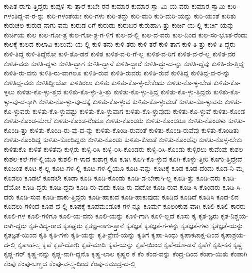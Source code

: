 {ಕುಪಿತ-ರಾಗು-ತ್ತಿದ್ದರು
ಕುಪ್ಪಳಿ-ಸು-ತ್ತಾರೆ
ಕುಬೇ-ರನ
ಕುಮಾರ
ಕುಮಾರ-ಸ್ವಾ-ಮಿ-ಯ-ವರು
ಕುಮಾರ-ಸ್ವಾಮಿ
ಕುರಿ-ಗಳಂತಿದ್ದ-ವ-ರ-ನ್ನು
ಕುರಿ-ಗಳಂತೆಯೇ
ಕುರಿ-ಗಳು
ಕುರಿ-ತದ್ದು
ಕುರಿ-ಮರಿ
ಕುರಿ-ಮರಿ-ಯನ್ನು
ಕುರಿ-ಯಂತೆ
ಕುರಿತು
ಕುರುಚಲ
ಕುರುಡ-ನಾಗು-ವನು
ಕುರುಡ-ರಿಗೆ
ಕುರುಡು
ಕುರುಬರ
ಕುರುಹಾಗಿ-ತ್ತು
ಕುರ್ಚಿ-ಯ-ಲ್ಲಿ
ಕುರ್ಚಿ-ಯನ್ನು
ಕುರ್ಚಿಯ
ಕುಲ
ಕುಲ-ಗೋ-ತ್ರ
ಕುಲ-ಗೋ-ತ್ರ-ಗ-ಳಿಗೆ
ಕುಲ-ದ-ಲ್ಲಿ
ಕುಲ-ದ-ವರು
ಕುಲ-ದಿಂದ
ಕುಲ-ಸಂ-ಭೂತ-ರೆಂದು
ಕುಲಕ್ಕೆ
ಕುಲದ
ಕುಲಾವಿ
ಕುಲುಮೆ-ಯ-ಲ್ಲಿ
ಕುಳಿ-ತನು
ಕುಳಿ-ತರು
ಕುಳಿ-ತರೆ
ಕುಳಿ-ತಾಗ
ಕುಳಿ-ತಿ-ತ್ತು
ಕುಳಿ-ತಿ-ದ್ದರು
ಕುಳಿ-ತಿದ್ದೆ
ಕುಳಿ-ತಿದ್ದೆನೋ
ಕುಳಿ-ತೊ-ಡನೆ
ಕುಳಿತ
ಕುಳಿತ-ವ-ರಿ-ಗೆ-ಲ್ಲ
ಕುಳಿತ-ವ-ರಿಗೆ
ಕುಳಿತ-ವ-ರೆ-ಲ್ಲ
ಕುಳಿತ-ವರ
ಕುಳಿತ-ವರು
ಕುಳಿತಿ-ದ್ದಳು
ಕುಳಿತಿ-ದ್ದಾಗ
ಕುಳಿತಿ-ದ್ದಾನೆ
ಕುಳಿತಿ-ದ್ದಾರೆ
ಕುಳಿತಿ-ದ್ದು-ದ-ನ್ನು
ಕುಳಿತಿ-ದ್ದೆವು
ಕುಳಿತಿ-ರು-ತ್ತಿದ್ದ
ಕುಳಿತಿ-ರು-ವನು
ಕುಳಿತಿ-ರು-ವಾಗಲೂ
ಕುಳಿತಿ-ರುವ
ಕುಳಿತಿ-ರುವರು
ಕುಳಿತಿ-ರುವೆ
ಕುಳಿತಿದ್ದ
ಕುಳಿತಿದ್ದ-ವ-ರ-ನ್ನು
ಕುಳಿತಿದ್ದ-ವರು
ಕುಳಿತಿದ್ದೀಯೋ
ಕುಳಿತಿರಲು
ಕುಳಿತು
ಕುಳಿತು-ಕೊ-ಳ್ಳ-ಬೇಕೆಂದು
ಕುಳಿತು-ಕೊ-ಳ್ಳ-ಬೇಡ
ಕುಳಿತು-ಕೊ-ಳ್ಳಲು
ಕುಳಿತು-ಕೊ-ಳ್ಳು-ತ್ತದೆ
ಕುಳಿತು-ಕೊ-ಳ್ಳು-ತ್ತಿ-ತ್ತು
ಕುಳಿತು-ಕೊ-ಳ್ಳು-ತ್ತಿದ್ದ
ಕುಳಿತು-ಕೊ-ಳ್ಳು-ತ್ತಿದ್ದರು
ಕುಳಿತು-ಕೊ-ಳ್ಳು-ವು-ದ-ಕ್ಕಾಗಿ
ಕುಳಿತು-ಕೊ-ಳ್ಳು-ವು-ದಕ್ಕೆ
ಕುಳಿತು-ಕೊ-ಳ್ಳುವ
ಕುಳಿತು-ಕೊ-ಳ್ಳುವಂತೆ
ಕುಳಿತು-ಕೊ-ಳ್ಳುವನು
ಕುಳಿತು-ಕೊ-ಳ್ಳುವರು
ಕುಳಿತು-ಕೊ-ಳ್ಳುವಷ್ಟು
ಕುಳಿತು-ಕೊ-ಳ್ಳುವಾಗ
ಕುಳಿತು-ಕೊ-ಳ್ಳುವುದು
ಕುಳಿತು-ಕೊ-ಳ್ಳುವೆ
ಕುಳಿತು-ಕೊಂಡ
ಕುಳಿತು-ಕೊಂಡ-ಮೇಲೆ
ಕುಳಿತು-ಕೊಂಡ-ರೆಂದೂ
ಕುಳಿತು-ಕೊಂಡರು
ಕುಳಿತು-ಕೊಂಡರೂ
ಕುಳಿತು-ಕೊಂಡಳು
ಕುಳಿತು-ಕೊಂಡಿ-ತ್ತು
ಕುಳಿತು-ಕೊಂಡಿ-ರು-ವು-ದ-ನ್ನು
ಕುಳಿತು-ಕೊಂಡಿ-ರುವಂತೆ
ಕುಳಿತು-ಕೊಂಡಿ-ರುವೆವು
ಕುಳಿತು-ಕೊಂಡಿತು
ಕುಳಿತು-ಕೊಂಡಿದ್ದ
ಕುಳಿತು-ಕೊಂಡಿದ್ದರು
ಕುಳಿತು-ಕೊಂಡು
ಕುಳಿತು-ಕೊಂಡೆ
ಕುಳಿತು-ಕೊಂಡೆವು
ಕುಳಿತು-ಕೊಳ್ಳ-ಬೇಕು
ಕುಳಿತುಕೊ
ಕುಳಿತೆ
ಕುಳಿತೆವು
ಕುಳ್ಳರು
ಕುಳ್ಳಿ-ರಿಸಿ
ಕುಳ್ಳಿ-ರಿಸಿ-ಕೊಂಡರು
ಕುಳ್ಳಿ-ರಿಸಿ-ಕೊಂಡು
ಕುಳ್ಳಿರಲು
ಕುವೆಂಪು
ಕುಶಲ
ಕುಶಲ-ಕಲೆ-ಗಳ-ಲ್ಲಿಯೂ
ಕುಶಲಿ-ಗ-ಳಾದ
ಕುಶಾಗ್ರ
ಕೂ
ಕೂಗಿ
ಕೂಗಿ-ಕೊ-ಳ್ಳುವ
ಕೂಗಿ-ಕೊಳ್ಳು-ತ್ತೀರಿ
ಕೂಗು-ತ್ತಿದ್ದೇವೆ
ಕೂಜಂತ
ಕೂಟ-ಕ್ಕೆ-ಲ್ಲ
ಕೂಟ-ಗಳ-ಲ್ಲಿ
ಕೂಟ-ಗಳ-ಲ್ಲಿಯೂ
ಕೂಟ-ವನ್ನು
ಕೂಟಕ್ಕೆ
ಕೂಡ
ಕೂಡ-ದೆಂದು
ಕೂಡ-ನಿ-ಮ್ಮ
ಕೂಡಲು
ಕೂಡಲೆ
ಕೂಡಲೇ
ಕೂಡಾ
ಕೂಡಿ
ಕೂಡಿ-ಕೊಂಡು
ಕೂಡಿ-ಡ-ಬೇಕಾಗಿ-ಲ್ಲ
ಕೂಡಿ-ತ್ತು
ಕೂಡಿ-ದರು
ಕೂಡಿ-ದೆಯೋ
ಕೂಡಿ-ದ್ದರು
ಕೂಡಿ-ದ್ದವು
ಕೂಡಿ-ರು-ವುದು
ಕೂಡಿ-ರು-ವುದೋ
ಕೂಡಿ-ರುವ
ಕೂಡಿ-ಸಿ-ಕೊಂಡರು
ಕೂಡಿ-ಸಿ-ದರು
ಕೂಡಿ-ಸುವ
ಕೂಡಿ-ಹಾಕು-ತ್ತಿದ್ದರು
ಕೂಡಿ-ಹಾಕುವ
ಕೂಡಿ-ಹಾಕುವುದು
ಕೂಡಿದ
ಕೂಡಿದೆ
ಕೂಡಿಸಿ
ಕೂದ-ಲಿನ
ಕೂದಲು-ಗಳಿಂದ
ಕೂಪ-ದ-ಲ್ಲಿ
ಕೂಪಕ್ಕೆ
ಕೂಪಮಂಡೂಕ-ಗಳ-ನ್ನೂ
ಕೂರ್ಮ
ಕೂಲಂಕುಷ-ವಾಗಿ
ಕೂಲಿ
ಕೂಲಿ-ಕಾರರು
ಕೂಲಿ-ಗಳ
ಕೂಲಿ-ಗಳಿಗೂ
ಕೂಲಿ-ಯ-ವನು
ಕೂಲಿ-ಯನ್ನು
ಕೂಳಿ-ಗಾಗಿ
ಕೂಳಿ-ಲ್ಲದೆ
ಕೂಸು
ಕೃ
ಕೃತ-ಜ್ಞರು
ಕೃತ-ನಿಶ್ಚಯ-ರಾಗಿ-ದ್ದರು
ಕೃತ-ವಿದ್ಯ-ರಾದ
ಕೃತಘ್ನರು
ಕೃತಜ್ಞ-ನಾಗು-ತ್ತಾನೆ
ಕೃತಜ್ಞತೆ
ಕೃತಜ್ಞತೆ-ಗ-ಳನ್ನು
ಕೃತಜ್ಞತೆ-ಗಳು
ಕೃತಜ್ಞತೆ-ಯನ್ನು
ಕೃತಜ್ಞತೆ-ಯಿಂದ
ಕೃತಿ
ಕೃತಿ-ಗಳು
ಕೃತಿ-ಯನ್ನು
ಕೃತಿ-ಶ್ರೇಣಿ-ಯನ್ನು
ಕೃತಿಗೆ
ಕೃಪಾ-ಸಿಂಧು
ಕೃಪಾಕಟಾಕ್ಷ-ದಿಂದ
ಕೃಪಾಶ್ರಯ-ದ-ಲ್ಲಿ
ಕೃಪಾಹ-ಸ್ತ
ಕೃಪೆ
ಕೃಪೆ-ದೋರಿ
ಕೃಪೆ-ಮಾಡಿ
ಕೃಪೆ-ಯನ್ನು
ಕೃಪೆ-ಯಿಂದ
ಕೃಪೆ-ಯೊ-ಡನೆ
ಕೃಪೆಗೆ
ಕೃಷಿ-ಕನ
ಕೃಷ್ಣ
ಕೃಷ್ಣ-ಗರ್
ಕೃಷ್ಣ-ನನ್ನು
ಕೃಷ್ಣ-ನಾಗಿ-ದ್ದನೊ
ಕೃಷ್ಣ-ಲಾಲ
ಕೃಷ್ಣರ
ಕೆ
ಕೆಂ
ಕೆಂಡ-ವನ್ನು
ಕೆಂದ್ರ-ದಿಂದ
ಕೆಂಪಾ-ಯಿತು
ಕೆಂಪಾಗಿ
ಕೆಂಪು
ಕೆಂಪು-ಬಣ್ಣದ
ಕೆಂಪು-ವ-ಸ್ತ್ರ-ದಿಂದ
ಕೆಂಪು-ಸಮುದ್ರ-ದ-ಲ್ಲಿ
}
